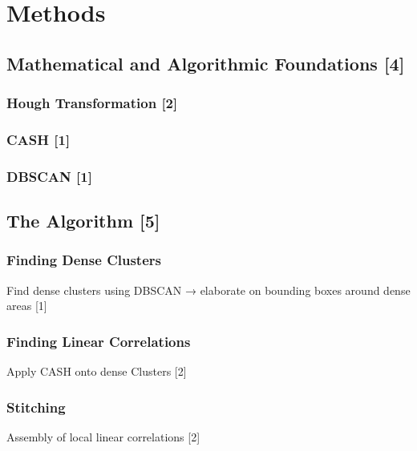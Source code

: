 \chapter{Methods}
\section{Mathematical and Algorithmic Foundations [4]}
\subsection{Hough Transformation [2]}
\subsection{CASH [1]}
\subsection{DBSCAN [1]}

\section{The Algorithm [5]}

\subsection{Finding Dense Clusters}
Find dense clusters using DBSCAN → elaborate on bounding boxes around dense areas [1]

\subsection{Finding Linear Correlations}
Apply CASH onto dense Clusters [2]

\subsection{Stitching}

Assembly of local linear correlations [2]